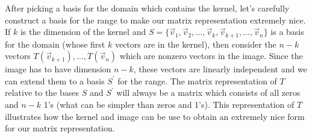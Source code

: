 \documentclass[10pt]{article}
\theoremstyle{plain}
\theoremstyle{box}
\begin{document}
After picking a basis for the domain which contains the kernel, let's carefully construct a basis for the range to make our matrix representation extremely nice.  If $k$ is the dimension of the kernel and $S=\{\vec v_1,\vec v_2,\ldots,\vec v_k, \vec v_{k+1},\ldots,\vec v_n\}$ is a basis for the domain (whose first $k$ vectors are in the kernel), then consider the $n-k$ vectors $T(\vec v_{k+1}),\ldots,T(\vec v_n)$ which are nonzero vectors in the image.  Since the image has to have dimension $n-k$, these vectors are linearly independent and we can extend them to a basis $S^\prime$ for the range. The matrix representation of $T$ relative to the bases $S$ and $S^\prime$ will always be a matrix which consists of all zeros and $n-k$ 1's (what can be simpler than zeros and 1's).  This representation of $T$ illustrates how the kernel and image can be use to obtain an extremely nice form for our matrix representation.   
\end{document}
